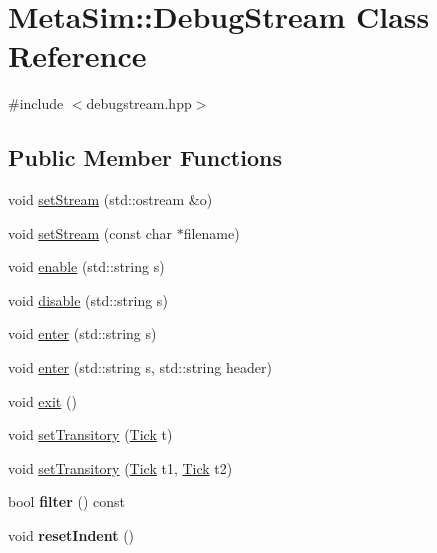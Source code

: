 \hypertarget{classMetaSim_1_1DebugStream}{}\section{Meta\+Sim\+:\+:Debug\+Stream Class Reference}
\label{classMetaSim_1_1DebugStream}


{\ttfamily \#include $<$debugstream.\+hpp$>$}

\subsection*{Public Member Functions}
\begin{DoxyCompactItemize}
\item 
void \hyperlink{classMetaSim_1_1DebugStream_a51b307e2b925b2a35641832ec7b9ed62}{set\+Stream} (std\+::ostream \&o)
\item 
void \hyperlink{classMetaSim_1_1DebugStream_a62046f1149ff12c4bc2c4c87bd4a404a}{set\+Stream} (const char $\ast$filename)
\item 
void \hyperlink{classMetaSim_1_1DebugStream_ac3d6c201bded911a76585642fad712e3}{enable} (std\+::string s)
\item 
void \hyperlink{classMetaSim_1_1DebugStream_a82f93fe70267eac9241f21489caccf35}{disable} (std\+::string s)
\item 
void \hyperlink{classMetaSim_1_1DebugStream_a6a00796bbceceda0284ede0b356d0596}{enter} (std\+::string s)
\item 
void \hyperlink{classMetaSim_1_1DebugStream_ab0fe57a08a1a2f03ecd262a0d71265cb}{enter} (std\+::string s, std\+::string header)
\item 
void \hyperlink{classMetaSim_1_1DebugStream_ac846773a72115317c5794fb2d5e0525b}{exit} ()
\item 
void \hyperlink{classMetaSim_1_1DebugStream_a6c8b2940e6c01770c31ce502a1bd15b8}{set\+Transitory} (\hyperlink{classMetaSim_1_1Tick}{Tick} t)
\item 
void \hyperlink{classMetaSim_1_1DebugStream_a415b665fb3c6181f911651696d8f8522}{set\+Transitory} (\hyperlink{classMetaSim_1_1Tick}{Tick} t1, \hyperlink{classMetaSim_1_1Tick}{Tick} t2)
\item 
bool {\bfseries filter} () const \hypertarget{classMetaSim_1_1DebugStream_adc9225225f48dff6368b83adfab176ad}{}\label{classMetaSim_1_1DebugStream_adc9225225f48dff6368b83adfab176ad}

\item 
void {\bfseries reset\+Indent} ()\hypertarget{classMetaSim_1_1DebugStream_ac134617e7a0793a6d24c3e49fb8c9e1c}{}\label{classMetaSim_1_1DebugStream_ac134617e7a0793a6d24c3e49fb8c9e1c}


\end{DoxyCompactItemize}
